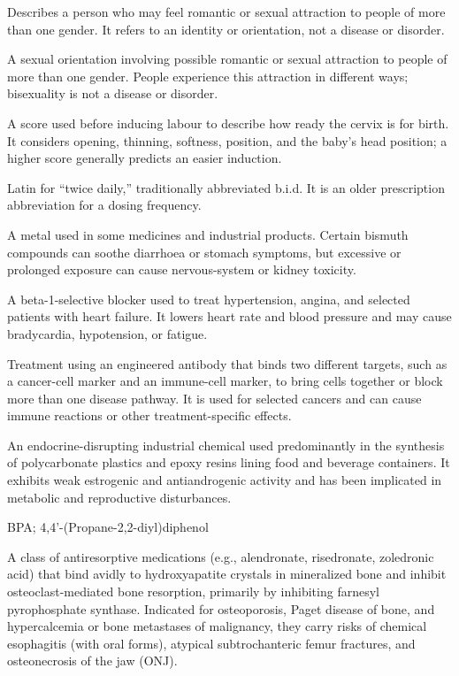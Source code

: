  Describes a person who may feel romantic or sexual
attraction to people of more than one gender. It refers to an identity or
orientation, not a disease or disorder.

 A sexual orientation involving possible romantic or
sexual attraction to people of more than one gender. People experience this
attraction in different ways; bisexuality is not a disease or disorder.

 A score used before inducing labour to describe how ready the cervix is for birth. It considers opening, thinning, softness, position, and the baby's head position; a higher score generally predicts an easier induction.

 Latin for “twice daily,” traditionally abbreviated b.i.d.
It is an older prescription abbreviation for a dosing frequency.

 A metal used in some medicines and industrial products. Certain bismuth compounds can soothe diarrhoea or stomach symptoms, but excessive or prolonged exposure can cause nervous-system or kidney toxicity.

 A beta-1-selective blocker used to treat hypertension, angina, and selected patients with heart failure. It lowers heart rate and blood pressure and may cause bradycardia, hypotension, or fatigue.

 Treatment using an engineered antibody that binds two different targets, such as a cancer-cell marker and an immune-cell marker, to bring cells together or block more than one disease pathway. It is used for selected cancers and can cause immune reactions or other treatment-specific effects.

 An endocrine-disrupting industrial chemical used predominantly in the synthesis of polycarbonate plastics and epoxy resins lining food and beverage containers. It exhibits weak estrogenic and antiandrogenic activity and has been implicated in metabolic and reproductive disturbances.

\synonyms
BPA; 4,4'-(Propane-2,2-diyl)diphenol

 A class of antiresorptive medications (e.g., alendronate, risedronate, zoledronic acid) that bind avidly to hydroxyapatite crystals in mineralized bone and inhibit osteoclast-mediated bone resorption, primarily by inhibiting farnesyl pyrophosphate synthase. Indicated for osteoporosis, Paget disease of bone, and hypercalcemia or bone metastases of malignancy, they carry risks of chemical esophagitis (with oral forms), atypical subtrochanteric femur fractures, and osteonecrosis of the jaw (ONJ).

